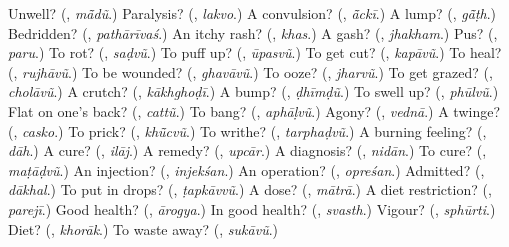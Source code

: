 \begin{tcolorbox}[breakable,colback=teal!4,colframe=teal!35!black,title={Before you move on}]
Unwell? (\textbf{}, \emph{mā̃dũ}.) Paralysis? (\textbf{}, \emph{lakvo}.) A convulsion? (\textbf{}, \emph{ā̃ckī}.) A lump? (\textbf{}, \emph{gā̃ṭh}.) Bedridden? (\textbf{}, \emph{pathārīvaś}.) An itchy rash? (\textbf{}, \emph{khas}.) A gash? (\textbf{}, \emph{jhakham}.) Pus? (\textbf{}, \emph{paru}.) To rot? (\textbf{}, \emph{saḍvũ}.) To puff up? (\textbf{}, \emph{ūpasvũ}.) To get cut? (\textbf{}, \emph{kapāvũ}.) To heal? (\textbf{}, \emph{rujhāvũ}.) To be wounded? (\textbf{}, \emph{ghavāvũ}.) To ooze? (\textbf{}, \emph{jharvũ}.) To get grazed? (\textbf{}, \emph{cholāvũ}.) A crutch? (\textbf{}, \emph{kākhghoḍī}.) A bump? (\textbf{}, \emph{ḍhīmḍũ}.) To swell up? (\textbf{}, \emph{phūlvũ}.) Flat on one's back? (\textbf{}, \emph{cattũ}.) To bang? (\textbf{}, \emph{aphāḷvũ}.) Agony? (\textbf{}, \emph{vednā}.) A twinge? (\textbf{}, \emph{casko}.) To prick? (\textbf{}, \emph{khū̃cvũ}.) To writhe? (\textbf{}, \emph{tarphaḍvũ}.) A burning feeling? (\textbf{}, \emph{dāh}.) A cure? (\textbf{}, \emph{ilāj}.) A remedy? (\textbf{}, \emph{upcār}.) A diagnosis? (\textbf{}, \emph{nidān}.) To cure? (\textbf{}, \emph{maṭāḍvũ}.) An injection? (\textbf{}, \emph{injekśan}.) An operation? (\textbf{}, \emph{opreśan}.) Admitted? (\textbf{}, \emph{dākhal}.) To put in drops? (\textbf{}, \emph{ṭapkāvvũ}.) A dose? (\textbf{}, \emph{mātrā}.) A diet restriction? (\textbf{}, \emph{parejī}.) Good health? (\textbf{}, \emph{ārogya}.) In good health? (\textbf{}, \emph{svasth}.) Vigour? (\textbf{}, \emph{sphūrti}.) Diet? (\textbf{}, \emph{khorāk}.) To waste away? (\textbf{}, \emph{sukāvũ}.)
\end{tcolorbox}
